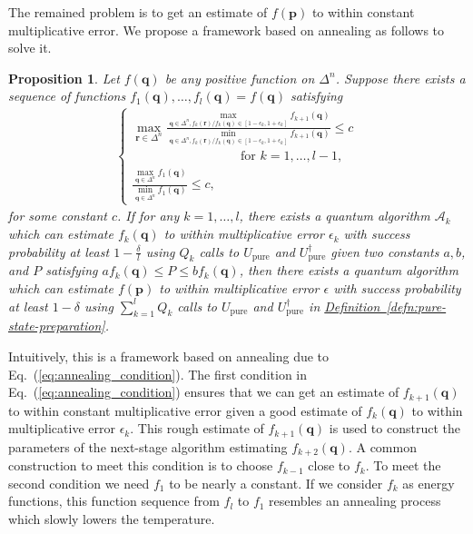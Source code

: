 \documentclass[journal]{IEEEtran}
\newtheorem{proposition}{Proposition}
\newcommand{\eq}[1]{Eq.~(\ref{eq:#1})}
\newcommand{\defn}[1]{\hyperref[defn:#1]{Definition~\ref*{defn:#1}}}
\begin{document}
The remained problem is to get an estimate of $f(\mathbf{p})$ to within constant multiplicative error. We propose a framework based on annealing as follows to solve it.

\begin{proposition}
\label{prop:annealing}
Let $f(\mathbf{q})$ be any positive function on $\Delta^n$. Suppose there exists a sequence of functions $f_1(\mathbf{q}),\ldots,f_l(\mathbf{q}) = f(\mathbf{q})$ satisfying
\begin{align}
    \begin{cases}\max_{\mathbf{r} \in \Delta^n}\frac{\max_{\mathbf{q}\in \Delta^n, f_k(\mathbf{r})/f_k(\mathbf{q})\in [1-\epsilon_k,1+\epsilon_k]} f_{k+1}(\mathbf{q}) }{\min_{\mathbf{q}\in \Delta^n, f_k(\mathbf{r})/f_k(\mathbf{q})\in [1-\epsilon_k,1+\epsilon_k]} f_{k+1}(\mathbf{q})} \le c  \\ \qquad\qquad\qquad\qquad\ \text{ for } k=1,\ldots,l-1\text{, }\\
    \frac{\max_{\mathbf{q}\in \Delta^n} f_{1}(\mathbf{q}) }{\min_{\mathbf{q}\in \Delta^n} f_{1}(\mathbf{q})} \le c,\label{eq:annealing_condition}
    \end{cases}
\end{align}
for some constant $c$. If for any $k = 1,\ldots,l$, there exists a quantum algorithm $\mathcal{A}_k$ which can estimate $f_k(\mathbf{q})$ to within multiplicative error $\epsilon_k$ with success probability at least $1-\frac{\delta}{l}$ using $Q_k$ calls to $U_{\mathrm{pure}}$ and $U_{\mathrm{pure}}^{\dagger}$ given two constants $a,b$, and $P$ satisfying $a f_k(\mathbf{q})\le P\le b f_k(\mathbf{q})$, then there exists a quantum algorithm which can estimate $f(\mathbf{p})$ to within multiplicative error $\epsilon$ with success probability at least $1-\delta$ using $\sum_{k=1}^l Q_k$ calls to $U_{\mathrm{pure}}$ and $U_{\mathrm{pure}}^{\dagger}$ in \defn{pure-state-preparation}.
\end{proposition}

Intuitively, this is a framework based on annealing due to  \eq{annealing_condition}. The first condition in \eq{annealing_condition} ensures that we can get an estimate of $f_{k+1}(\mathbf{q})$ to within constant multiplicative error given a good estimate of $f_k(\mathbf{q})$ to within multiplicative error $\epsilon_k$. This rough estimate of $f_{k+1}(\mathbf{q})$ is used to construct the parameters of the next-stage algorithm estimating $f_{k+2}(\mathbf{q})$. A common construction to meet this condition is to choose $f_{k-1}$ close to $f_k$. To meet the second condition we need $f_1$ to be nearly a constant. If we consider $f_k$ as energy functions, this function sequence from $f_l$ to $f_1$ 
resembles an annealing process which slowly lowers the temperature. %
\end{document}
